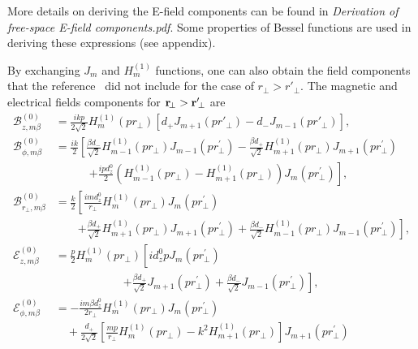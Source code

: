 More details on deriving the E-field components can be found in \textit{Derivation of free-space E-field components.pdf}. Some properties of Bessel functions are used in deriving these expressions (see appendix). 

By exchanging $J_m$ and $H_m^{(1)}$ functions, one can also obtain the field components that the reference~\cite{Klimov2004} did not include for the case of $ r\!_\perp>r'\!_\perp $. The magnetic and electrical fields components for $ \mathbf{r}\!_\perp>\mathbf{r}'\!_\perp $ are 
\begin{align}
\mathcal{B}_{z,m\beta}^{(0)} &= \frac{ikp}{2\sqrt{2}}H^{(1)}_m(pr\!_\perp)\left[ d_{+} J_{m+1}(pr'\!\!_\perp) \!-\! d_- J_{m-1}(pr'\!_\perp) \right],\\
\mathcal{B}_{\phi,m\beta}^{(0)} &= \frac{ik}{2}\left[ \frac{\beta d_{-}}{\sqrt{2}} H^{(1)}_{m-1}\left( pr\!_\perp \right)J_{m-1}\left( {pr\!_\perp^{\prime} }\right) -\frac{\beta d_+}{\sqrt{2}} H^{(1)}_{m+1}\left( pr\!_\perp \right)J_{m+1}\left( {pr\!_\perp^{\prime} }\right)\right. \nonumber\\ 
&\qquad\quad \left. + \frac{ipd^0_z}{2}\left(H^{(1)}_{m-1}(pr\!_\perp)-H^{(1)}_{m+1}(pr\!_\perp) \right)J_m(pr\!_\perp^{\prime}) \right],\\
\mathcal{B}_{r\!_\perp, m\beta}^{(0)} &= \frac{k}{2}\left[\frac{i m d^0_z}{r\!_\perp} H^{(1)}_m\left( pr\!_\perp \right) J_m\left( {pr\!_\perp^{\prime} }\right) \right. \nonumber\\
&\qquad \left. +\frac{\beta d_+}{\sqrt{2}} H^{(1)}_{m\!+\!1}(pr\!_\perp) J_{m\!+\! 1}(pr\!_\perp^{\prime}) \!+\! \frac{\beta d_-}{\sqrt{2}} H^{(1)}_{m\!-\! 1}(pr\!_\perp) J_{m\!-\!1}(pr\!_\perp^{\prime})   \right],\\
\mathcal{E}_{z,m\beta}^{(0)} 
&= \frac{p}{2}H^{(1)}_{m}\left( pr\!_\perp \right)\left[  id^0_z p J_m\left( {pr\!_\perp^{\prime} }\right) \phantom{\frac{d^0_z}{\sqrt{2}}} \right. \nonumber\\
&\qquad\qquad\qquad \left. + \frac{\beta d_{+}}{\sqrt{2}} J_{m+1}\left( {pr\!_\perp^{\prime} }\right) +\frac{\beta d_-}{\sqrt{2}} J_{m-1}\left( {pr\!_\perp^{\prime} }\right) \right], \\
\mathcal{E}_{\phi,m\beta}^{(0)} 
&= -\frac{im\beta d^0_z}{2r\!_\perp} H^{(1)}_{m}\left( pr\!_\perp \right) J_m\left( {pr\!_\perp^{\prime} }\right) \nonumber\\
&\quad+\frac{d_+}{2\sqrt{2}} \left[ \frac{mp}{r\!_\perp}H^{(1)}_{m}\left( pr\!_\perp \right)-k^2 H^{(1)}_{m+1}\left( pr\!_\perp \right)\right] J_{m+1}\left( {pr\!_\perp^{\prime} }\right) \nonumber\\

\end{align}
